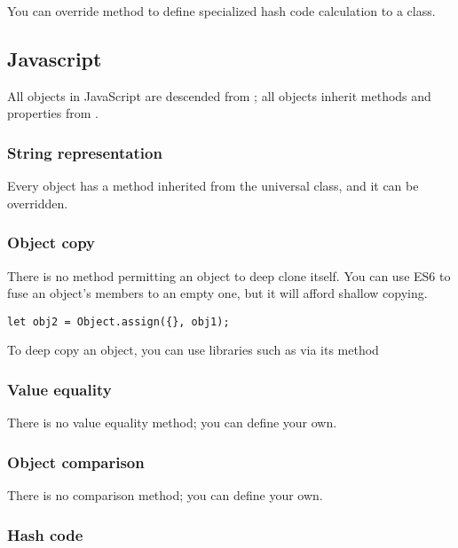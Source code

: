 \documentclass{KodeBook}
\begin{document}
You can override  method to define specialized hash code calculation to a class.


\subsection{Javascript}

All objects in JavaScript are descended from ; all objects inherit methods and properties from .

\subsubsection{String representation}

Every object has a  method inherited from the universal class, and it can be overridden. 



\subsubsection{Object copy}

There is no method permitting an object to deep clone itself. 
You can use ES6  to fuse an object's members to an empty one, but it will afford shallow copying. 
\begin{lstlisting}[style=codeStyle]
let obj2 = Object.assign({}, obj1);
\end{lstlisting} 
To deep copy an object, you can use libraries such as  via its method 

\subsubsection{Value equality}

There is no value equality method; you can define your own.

\subsubsection{Object comparison}

There is no comparison method; you can define your own.

\subsubsection{Hash code}
\end{document}
